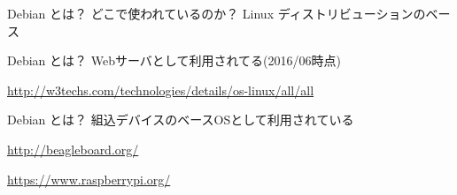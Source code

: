 \begin{frame}{Debian とは？}
どこで使われているのか？\pause
Linux ディストリビューションのベース

  \begin{center}
  \end{center}

\end{frame}

\begin{frame}{Debian とは？}
Webサーバとして利用されてる(2016/06時点)

  \tiny{\url{http://w3techs.com/technologies/details/os-linux/all/all}}

\end{frame}

\begin{frame}{Debian とは？}
組込デバイスのベースOSとして利用されている

 \url{http://beagleboard.org/}

 \url{https://www.raspberrypi.org/}

 \end{frame}

